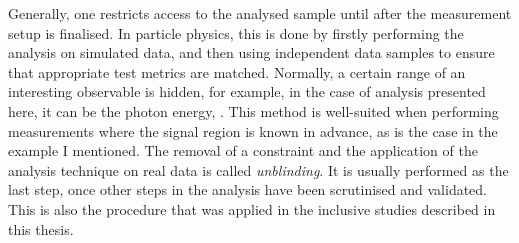 Generally, one restricts access to the analysed sample until after the measurement setup is finalised.
In particle physics, this is done by firstly performing the analysis on simulated data, 
and then using independent data samples to ensure that appropriate test metrics are matched.
Normally, a certain range of an interesting observable is hidden, for example, in the case of \BtoXsgamma analysis presented here, it can be the photon energy, \Egamma.
This method is well-suited when performing measurements where the signal region is known in advance, as is the case in the example I mentioned.
The removal of a constraint and the application of the analysis technique on real data is called \textit{unblinding}.
It is usually performed as the last step, once other steps in the analysis have been scrutinised and validated.
This is also the procedure that was applied in the inclusive \BtoXsgamma studies described in this thesis.